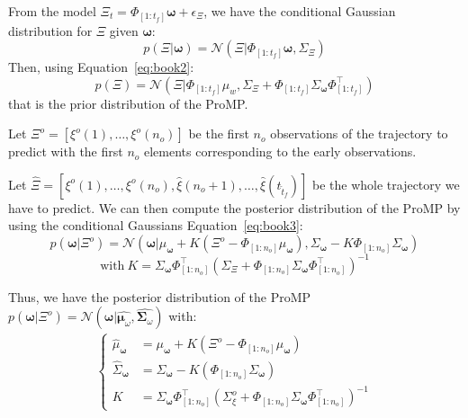 \documentclass[utf8]{frontiersSCNS} %
\begin{document}
\begin{appendices}
From the model $\Xi_t = \Phi_{[1:t_f]} \boldsymbol{\omega} + \epsilon_\Xi$, we have the conditional Gaussian distribution for $\Xi$ given $\boldsymbol{\omega}$: 
\begin{equation}
p(\Xi | \boldsymbol{\omega}) = \mathcal{N}(\Xi | \Phi_{[1:t_f]} \boldsymbol{\omega}, \Sigma_\Xi)
\end{equation}
Then, using Equation~\ref{eq:book2}:
\begin{equation}
\label{eq:marg}
p(\Xi) = \mathcal{N}(\Xi |\Phi_{[1:t_f]} \mu_w, \Sigma_\Xi + \Phi_{[1:t_f]} \Sigma_{\boldsymbol{\omega}} \Phi_{[1:t_f]}^\top ) 
\end{equation}
that is the prior distribution of the ProMP.

Let $\Xi^o=[\xi^o(1),\ldots, \xi^o({n_o})]$ be the first $n_o$ observations of the trajectory to predict with the first $n_o$ elements corresponding to the early observations.

Let $\hat{\Xi} = [\xi^o({1}), \ldots, \xi^o({n_o}), \hat{\xi}({n_o+1}), \ldots, \hat{\xi}(t_{\hat{t}_f})]$ be the whole trajectory we have to predict.
We can then compute the posterior distribution of the ProMP by using the conditional Gaussians Equation~\ref{eq:book3}:
\begin{equation}
\label{eq:cond}
p(\boldsymbol{\omega} | \Xi^o) = \mathcal{N}(\boldsymbol{\omega} | \mu_{\boldsymbol{\omega}} + K(\Xi^o - \Phi_{[1:n_o]} \mu_{\boldsymbol{\omega}}), \Sigma_{\boldsymbol{\omega}} - K \Phi_{[1:n_o]} \Sigma_{\boldsymbol{\omega}}) 
\end{equation}
\begin{equation}
\mathrm{with~} K = \Sigma_{\boldsymbol{\omega}} \Phi_{[1:n_o]}^\top (\Sigma_\Xi + \Phi_{[1:n_o]} \Sigma_{\boldsymbol{\omega}}\Phi_{[1:n_o]}^\top)^{-1}
\end{equation}

Thus, we have the posterior distribution of the ProMP $p(\boldsymbol{\omega} | \Xi^o) = \mathcal{N}(\boldsymbol{\omega} | \hat{\boldsymbol{\mu}_\omega}, \hat{\boldsymbol{\Sigma}_\omega})$ with:
\begin{eqnarray} 
\left\{
\begin{array}{rl}
\hat{\mu}_{\boldsymbol{\omega}} &= \mu_{\boldsymbol{\omega}} + K(\Xi^o - \Phi_{[1:n_o]} \mu_{\boldsymbol{\omega}}) \\ 
\hat{\Sigma}_{\boldsymbol{\omega}} &= \Sigma_{\boldsymbol{\omega}} - K(\Phi_{[1:n_o]} \Sigma_{\boldsymbol{\omega}}) \\
K&= \Sigma_{\boldsymbol{\omega}}\Phi_{[1:n_o]}^\top(\Sigma_\xi^o + \Phi_{[1:n_o]}\Sigma_{\boldsymbol{\omega}} \Phi_{[1:n_o]}^\top)^{-1}
\end{array}
\right.
\end{eqnarray}


%
\end{appendices} 
\end{document}
